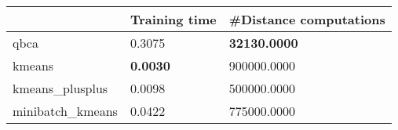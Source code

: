 \begin{table}[htbp]
\centering
\begin{tabular}{lll}
\toprule
 & Training time & #Distance computations \\
\midrule
qbca & 0.3075 & \textbf{32130.0000} \\
kmeans & \textbf{0.0030} & 900000.0000 \\
kmeans_plusplus & 0.0098 & 500000.0000 \\
minibatch_kmeans & 0.0422 & 775000.0000 \\
\bottomrule
\end{tabular}
\end{table}
